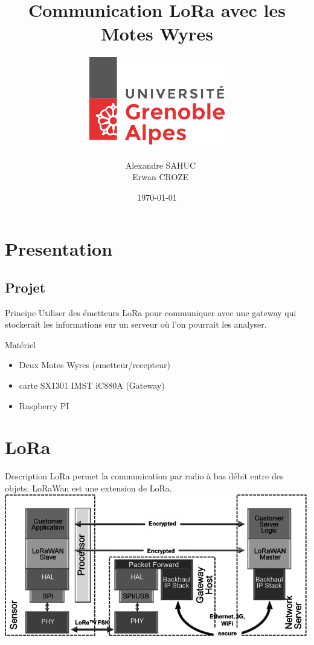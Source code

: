 \documentclass{beamer}
\title{Communication LoRa avec les Motes Wyres}
\author{\includegraphics[scale=0.3]{univ.png} \\~ \\ ~ Alexandre SAHUC\\~ Erwan CROZE}
\institute{Université Joseph Fourier \newline M2M}
\date{\today}
\begin{document}
\begin{frame}
	\titlepage
\end{frame}

\section{Presentation}
\subsection{Projet}
\begin{frame}
  	\begin{block}{Principe}
  		Utiliser des émetteurs LoRa pour communiquer avec une gateway qui stockerait les informations sur un serveur où l'on pourrait les analyser.
	\end{block}
	
	\begin{exampleblock}{Matériel}
		\begin{itemize}
			\item Deux Motes Wyres (emetteur/recepteur)
			\item carte SX1301 IMST iC880A (Gateway)
			\item Raspberry PI 
		\end{itemize}			
	\end{exampleblock}
\end{frame}

\section{LoRa}
\begin{frame}
	\begin{block}{Description}
		LoRa permet la communication par radio à bas débit entre des objets.
		LoRaWan est une extension de LoRa.
		\center
		\includegraphics[scale=0.5]{LoRa-network.png}
	\end{block}
\end{frame}
\end{document}
